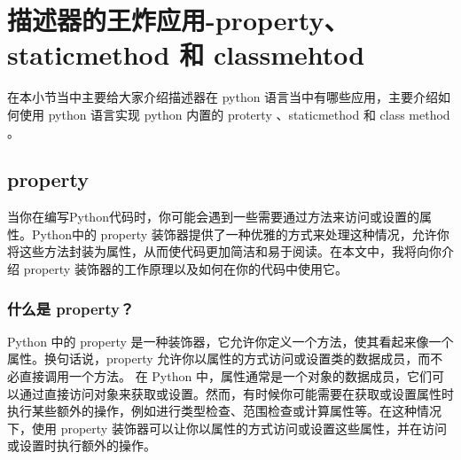 \section{描述器的王炸应用-property、staticmethod 和 classmehtod}
在本小节当中主要给大家介绍描述器在 python 语言当中有哪些应用，主要介绍如何使用 python 语言实现 python 内置的 proterty 、staticmethod 和 class method 。
\subsection{property}
当你在编写Python代码时，你可能会遇到一些需要通过方法来访问或设置的属性。Python中的 property 装饰器提供了一种优雅的方式来处理这种情况，允许你将这些方法封装为属性，从而使代码更加简洁和易于阅读。在本文中，我将向你介绍 property 装饰器的工作原理以及如何在你的代码中使用它。
\subsubsection{什么是 property？}
Python 中的 property 是一种装饰器，它允许你定义一个方法，使其看起来像一个属性。换句话说，property 允许你以属性的方式访问或设置类的数据成员，而不必直接调用一个方法。
在 Python 中，属性通常是一个对象的数据成员，它们可以通过直接访问对象来获取或设置。然而，有时候你可能需要在获取或设置属性时执行某些额外的操作，例如进行类型检查、范围检查或计算属性等。在这种情况下，使用 property 装饰器可以让你以属性的方式访问或设置这些属性，并在访问或设置时执行额外的操作。
